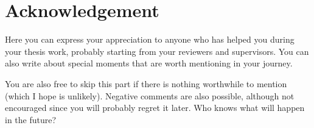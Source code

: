 \chapter*{Acknowledgement}


Here you can express your appreciation to anyone who has helped you during your thesis work, probably starting from your reviewers and supervisors. You can also write about special moments that are worth mentioning in your journey.

You are also free to skip this part if there is nothing worthwhile to mention (which I hope is unlikely). Negative comments are also possible, although not encouraged since you will probably regret it later. Who knows what will happen in the future?